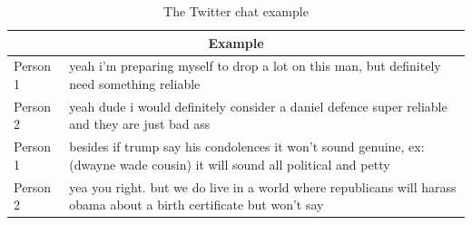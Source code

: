 \begin{table}[t]
\centering
 \begin{tabular}{|p{2cm}|p{8cm}|} 
 \hline
 \multicolumn{2}{|c|}{Example} \\
 \hline
 Person 1 & yeah i'm preparing myself to drop a lot on this man, but definitely need something reliable \\ 
 \hline
 Person 2 & yeah dude i would definitely consider a daniel defence super reliable and they are just bad ass \\
 \hline
 Person 1 & besides if trump say his condolences it won't sound genuine, ex: (dwayne wade cousin) it will sound all political and petty \\
 \hline
 Person 2 & yea you right. but we do live in a world where republicans will harass obama about a birth certificate but won't say \\
 \hline
 \end{tabular}
 \caption{The Twitter chat example}
\label{tab:twitter_chat}
\end{table}

